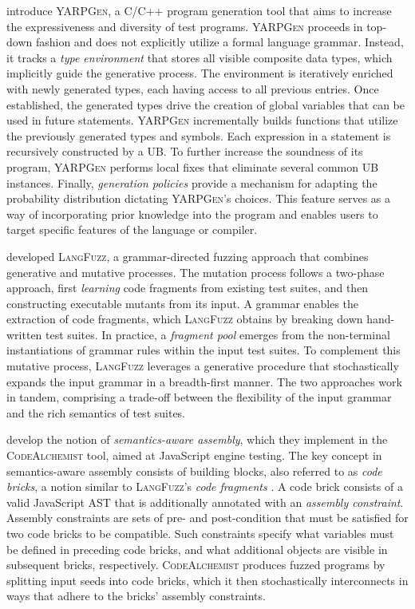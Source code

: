 \citet{livinskii2020random} introduce \textsc{YARPGen}, a C/C++ program generation
tool that aims to increase the expressiveness and diversity of test programs.
\textsc{YARPGen} proceeds in top-down fashion and does not explicitly utilize
a formal language grammar.
Instead, it tracks a \textit{type environment} that stores all visible composite
data types, which implicitly guide the generative process.
The environment is iteratively enriched with newly generated types,
each having access to all previous entries.
Once established, the generated types drive the creation of global variables
that can be used in future statements.
\textsc{YARPGen} incrementally builds functions that utilize 
the previously generated types and symbols.
Each expression in a statement is recursively constructed by a
\Gls{UB}.
To further increase the soundness of its program, \textsc{YARPGen}
performs local fixes that eliminate several common \gls{UB} instances.
Finally, \textit{generation policies} provide a mechanism
for adapting the probability distribution dictating
\textsc{YARPGen}'s choices.
This feature serves as a way of incorporating prior knowledge into
the program and enables users to target specific features of the language
or compiler.

\citet{holler2012fuzzing} developed \textsc{LangFuzz}, a grammar-directed fuzzing
approach that combines generative and mutative processes.
The mutation process follows a two-phase approach, first \textit{learning}
code fragments from existing test suites, and then constructing executable
mutants from its input. 
A grammar enables the extraction of code fragments, which \textsc{LangFuzz}
obtains by breaking down hand-written test suites.
In practice, a \textit{fragment pool} emerges from the non-terminal
instantiations of grammar rules within the input test suites.
To complement this mutative process, \textsc{LangFuzz} leverages
a generative procedure that stochastically expands the input
grammar in a breadth-first manner.
The two approaches work in tandem, comprising a trade-off
between the flexibility of the input grammar and the
rich semantics of test suites.

\citet{han2019codealchemist} develop the notion of \textit{semantics-aware assembly},
which they implement in the \textsc{CodeAlchemist} tool, aimed at JavaScript
engine testing.
The key concept in semantics-aware assembly consists of building blocks,
also referred to as \textit{code bricks}, a notion similar to
\textsc{LangFuzz}'s \textit{code fragments} \cite{holler2012fuzzing}.
A code brick consists of a valid JavaScript \gls{AST} that is additionally
annotated with an \textit{assembly constraint}.
Assembly constraints are sets of pre- and post-condition
that must be satisfied for two code bricks to be compatible.
Such constraints specify what variables must be defined in
preceding code bricks, and what additional objects are
visible in subsequent bricks, respectively.
\textsc{CodeAlchemist} produces fuzzed programs by splitting
input seeds into code bricks, which it then stochastically
interconnects in ways that adhere to the bricks'
assembly constraints.

